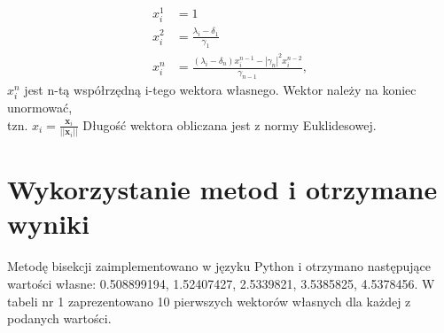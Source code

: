 \documentclass{article}
\begin{document}
\begin{equation}
\begin{aligned}
x_i^1 &= 1 \\
x_i^2 &= \frac{\lambda_i - \delta_1}{\gamma_1} \\
x_i^n &= \frac{(\lambda_i - \delta_n)x_i^{n-1} - |\gamma_n|^2 x_i^{n-2}}{\gamma_{n-1}},
\end{aligned}
\end{equation}
$x_i^n$ jest n-tą współrzędną i-tego wektora własnego. Wektor należy na koniec unormować,\\ tzn. $ x_i = \frac{\mathbf{x}_i}{||\mathbf{x}_i||}$ Długość wektora obliczana jest z normy Euklidesowej.


\section{Wykorzystanie metod i otrzymane wyniki}
Metodę bisekcji zaimplementowano w języku Python i otrzymano następujące wartości własne: 0.508899194, 1.52407427, 2.5339821, 3.5385825, 4.5378456. W tabeli nr 1 zaprezentowano 10 pierwszych wektorów własnych dla każdej z podanych wartości. \\
\end{document}
